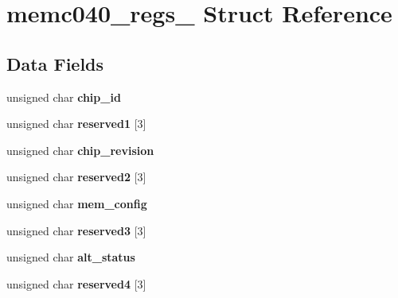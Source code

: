 \hypertarget{structmemc040__regs__}{}\section{memc040\+\_\+regs\+\_\+ Struct Reference}
\label{structmemc040__regs__}
\subsection*{Data Fields}
\begin{DoxyCompactItemize}
\item 
\mbox{\label{structmemc040__regs___a0813db8b64b41a61531fe667f1126e58}} 
unsigned char {\bfseries chip\+\_\+id}
\item 
\mbox{\label{structmemc040__regs___a398034372ceb601e259890565d5ab54a}} 
unsigned char {\bfseries reserved1} \mbox{[}3\mbox{]}
\item 
\mbox{\label{structmemc040__regs___a8e9ea1d1ceb6ad38214fc366454899da}} 
unsigned char {\bfseries chip\+\_\+revision}
\item 
\mbox{\label{structmemc040__regs___acd1a33e09e55dd717480eb6b4beec5dd}} 
unsigned char {\bfseries reserved2} \mbox{[}3\mbox{]}
\item 
\mbox{\label{structmemc040__regs___a79e85b9d119d3a8b86aec6d74892f367}} 
unsigned char {\bfseries mem\+\_\+config}
\item 
\mbox{\label{structmemc040__regs___ab74c437d8c4cd520326d162cf647f5af}} 
unsigned char {\bfseries reserved3} \mbox{[}3\mbox{]}
\item 
\mbox{\label{structmemc040__regs___a53e1ebc4218682e2677fd1c623265d99}} 
unsigned char {\bfseries alt\+\_\+status}
\item 
\mbox{\label{structmemc040__regs___abd7b66900156f08bfc2977080b23c43e}} 
unsigned char {\bfseries reserved4} \mbox{[}3\mbox{]}
\item 
\mbox{\label{structmemc040__regs___a519e51ff10ef0ccd873daa6de8917463}} 

\end{DoxyCompactItemize}
